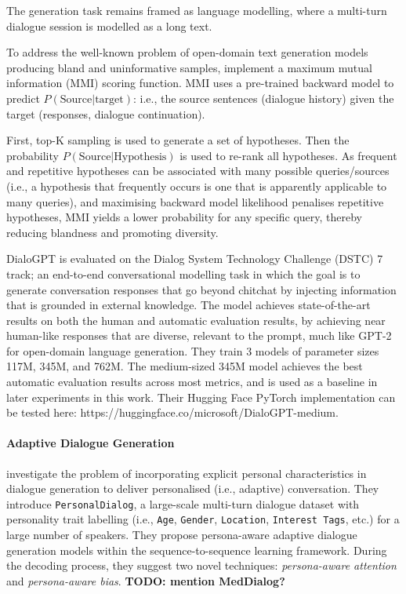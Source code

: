 The generation task remains framed as language modelling, where a multi-turn dialogue session is modelled as a long text. 

To address the well-known problem of open-domain text generation models producing bland and uninformative samples, \citeauthor{zhang2019dialogpt} implement a maximum mutual information (MMI) scoring function. MMI uses a pre-trained backward model to predict $P(\text{Source} | \text{target})$: i.e., the source sentences (dialogue history) given the target (responses, dialogue continuation). 

First, top-K sampling is used to generate a set of hypotheses. Then the probability $P(\text{Source} | \text{Hypothesis})$ is used to re-rank all hypotheses. As frequent and repetitive hypotheses can be associated with many possible queries/sources (i.e., a hypothesis that frequently occurs is one that is apparently applicable to many queries), and maximising backward model likelihood penalises repetitive hypotheses, MMI yields a lower probability for any specific query, thereby reducing blandness and promoting diversity.

DialoGPT is evaluated on the Dialog System Technology Challenge (DSTC) 7 track; an end-to-end conversational modelling task in which the goal is to generate conversation responses that go beyond chitchat by injecting information that is grounded in external knowledge. The model achieves state-of-the-art results on both the human and automatic evaluation results, by achieving near human-like responses that are diverse, relevant to the prompt, much like GPT-2 for open-domain language generation. They train 3 models of parameter sizes 117M, 345M, and 762M. The medium-sized 345M model achieves the best automatic evaluation results across most metrics, and is used as a baseline in later experiments in this work. Their Hugging Face PyTorch implementation can be tested here: https://huggingface.co/microsoft/DialoGPT-medium.


\paragraph{Adaptive Dialogue Generation}

\cite{zheng2019personalized} investigate the problem of incorporating explicit personal characteristics in dialogue generation to deliver personalised (i.e., adaptive) conversation. They introduce \texttt{PersonalDialog}, a large-scale multi-turn dialogue dataset with personality trait labelling (i.e., \texttt{Age}, \texttt{Gender}, \texttt{Location}, \texttt{Interest Tags}, etc.) for a large number of speakers. They propose persona-aware adaptive dialogue generation models within the sequence-to-sequence learning framework. During the decoding process, they suggest two novel techniques: \textit{persona-aware attention} and \textit{persona-aware bias}. \textbf{TODO: mention MedDialog?}


